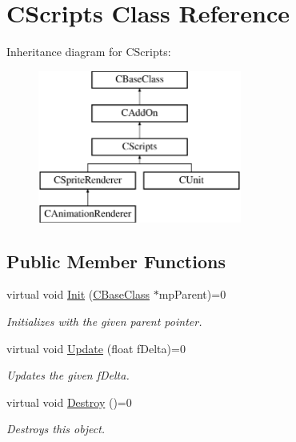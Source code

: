 \hypertarget{class_c_scripts}{}\section{C\+Scripts Class Reference}
\label{class_c_scripts}
Inheritance diagram for C\+Scripts\+:\begin{figure}[H]
\begin{center}
\leavevmode
\includegraphics[height=5.000000cm]{class_c_scripts}
\end{center}
\end{figure}
\subsection*{Public Member Functions}
\begin{DoxyCompactItemize}
\item 
virtual void \hyperlink{class_c_scripts_a7f5c612a8704be665932d6f1830ad0fe}{Init} (\hyperlink{class_c_base_class}{C\+Base\+Class} $\ast$mp\+Parent)=0
\begin{DoxyCompactList}\small\item\em Initializes with the given parent pointer. \end{DoxyCompactList}\item 
virtual void \hyperlink{class_c_scripts_ad7567e93972e760eb0d307ad263923bb}{Update} (float f\+Delta)=0
\begin{DoxyCompactList}\small\item\em Updates the given f\+Delta. \end{DoxyCompactList}\item 
virtual void \hyperlink{class_c_scripts_a88a9c3fbc8248e7cd43291a3fe9bce78}{Destroy} ()=0\hypertarget{class_c_scripts_a88a9c3fbc8248e7cd43291a3fe9bce78}{}\label{class_c_scripts_a88a9c3fbc8248e7cd43291a3fe9bce78}

\begin{DoxyCompactList}\small\item\em Destroys this object. \end{DoxyCompactList}\end{DoxyCompactItemize}
